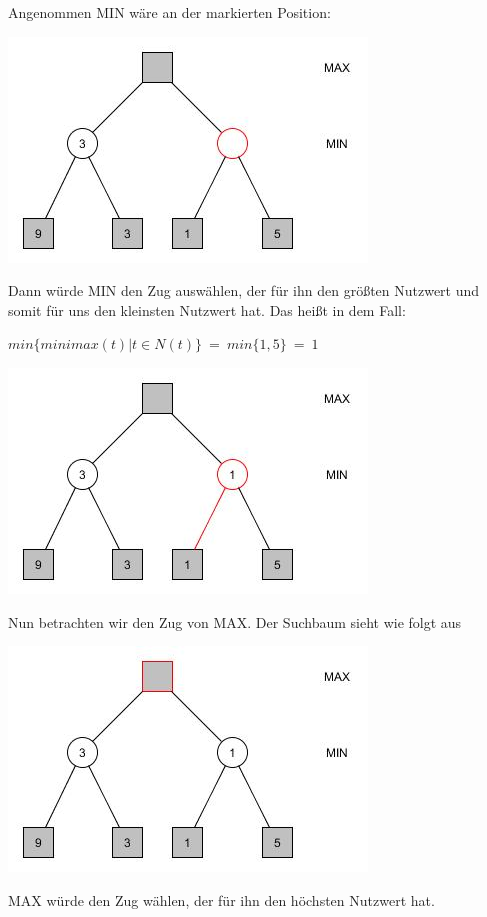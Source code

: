 \newpage

Angenommen MIN wäre an der markierten Position:
\begin{center}
	\includegraphics[width = 7 cm]{chapters/minimax/jpg/Graph-Minmax2-3.jpg}
\end{center}

Dann würde MIN den Zug auswählen, der für ihn den größten Nutzwert und somit für uns den kleinsten Nutzwert hat. Das heißt in dem Fall:
\begin{center}
	$min\{minimax(t) | t \in N(t)\} ~=~ min\{1,5\} ~=~ 1$

	\includegraphics[width = 7 cm]{chapters/minimax/jpg/Graph-Minmax2-4.jpg}
\end{center}

Nun betrachten wir den Zug von MAX. Der Suchbaum sieht wie folgt aus

\begin{center}
	\includegraphics[width = 7 cm]{chapters/minimax/jpg/Graph-Minmax2.jpg}
\end{center}

MAX würde den Zug wählen, der für ihn den höchsten Nutzwert hat.\\

